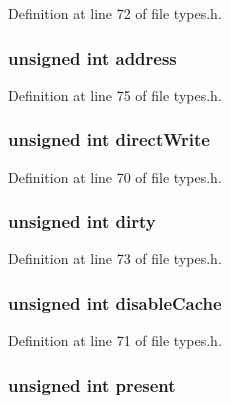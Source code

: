 Definition at line 72 of file types.h.

\hypertarget{structpage_a2f55ff1f6cd45ca1b6431493ab5614eb}{
\subsubsection[{address}]{\setlength{\rightskip}{0pt plus 5cm}unsigned int {\bf address}}}
\label{structpage_a2f55ff1f6cd45ca1b6431493ab5614eb}


Definition at line 75 of file types.h.

\hypertarget{structpage_a8bcb7dbeb8dba19debc9a4a062f8a6bc}{
\subsubsection[{directWrite}]{\setlength{\rightskip}{0pt plus 5cm}unsigned int {\bf directWrite}}}
\label{structpage_a8bcb7dbeb8dba19debc9a4a062f8a6bc}


Definition at line 70 of file types.h.

\hypertarget{structpage_a930a1ab0130f619f847727300b9d156a}{
\subsubsection[{dirty}]{\setlength{\rightskip}{0pt plus 5cm}unsigned int {\bf dirty}}}
\label{structpage_a930a1ab0130f619f847727300b9d156a}


Definition at line 73 of file types.h.

\hypertarget{structpage_afed734c6ffccf36d8318903bfe4e4e1b}{
\subsubsection[{disableCache}]{\setlength{\rightskip}{0pt plus 5cm}unsigned int {\bf disableCache}}}
\label{structpage_afed734c6ffccf36d8318903bfe4e4e1b}


Definition at line 71 of file types.h.

\hypertarget{structpage_abc4c133346e4b24e2e71fe80ffc39a6f}{
\subsubsection[{present}]{\setlength{\rightskip}{0pt plus 5cm}unsigned int {\bf present}}}
\label{structpage_abc4c133346e4b24e2e71fe80ffc39a6f}


